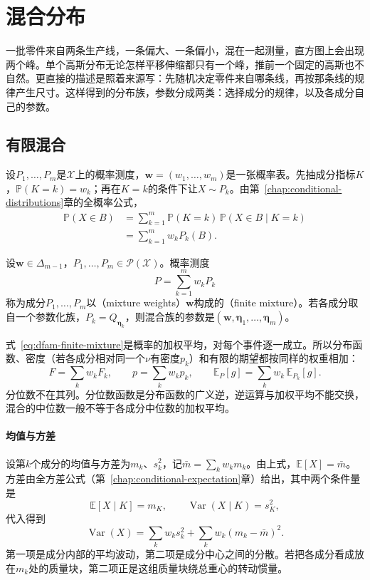 \section{混合分布}
\label{sec:dfam-mixtures}

一批零件来自两条生产线，一条偏大、一条偏小，混在一起测量，直方图上会出现两个峰。单个高斯分布无论怎样平移伸缩都只有一个峰，推前一个固定的高斯也不自然。更直接的描述是照着来源写：先随机决定零件来自哪条线，再按那条线的规律产生尺寸。这样得到的分布族，参数分成两类：选择成分的规律，以及各成分自己的参数。

\subsection{有限混合}
\label{sec:dfam-finite-mixture}

设$P_1,\dots,P_m$是$\mathcal{X}$上的概率测度，$\bm{w}=(w_1,\dots,w_m)$是一张概率表。先抽成分指标$K$，$\mathbb{P}(K=k)=w_k$；再在$K=k$的条件下让$X\sim P_k$。由第~\ref{chap:conditional-distributions}章的全概率公式，
\[
  \begin{aligned}
    \mathbb{P}(X\in B)&=\sum_{k=1}^{m}\mathbb{P}(K=k)\,\mathbb{P}(X\in B\mid K=k)\\
    &=\sum_{k=1}^{m}w_kP_k(B).
  \end{aligned}
\]

\begin{definition}[有限混合]
\label{def:dfam-finite-mixture}
设$\bm{w}\in\Delta_{m-1}$，$P_1,\dots,P_m\in\mathcal{P}(\mathcal{X})$。概率测度
\begin{equation}
  P=\sum_{k=1}^{m}w_kP_k
  \label{eq:dfam-finite-mixture}
\end{equation}
称为成分$P_1,\dots,P_m$以（mixture weights）$\bm{w}$构成的（finite mixture）。若各成分取自一个参数化族，$P_k=Q_{\bm{\eta}_k}$，则混合族的参数是$(\bm{w},\bm{\eta}_1,\dots,\bm{\eta}_m)$。
\end{definition}

式~\eqref{eq:dfam-finite-mixture}是概率的加权平均，对每个事件逐一成立。所以分布函数、密度（若各成分相对同一个$\nu$有密度$p_k$）和有限的期望都按同样的权重相加：
\[
  F=\sum_kw_kF_k,\qquad p=\sum_kw_kp_k,\qquad\mathbb{E}_P[g]=\sum_kw_k\,\mathbb{E}_{P_k}[g].
\]
分位数不在其列。分位数函数是分布函数的广义逆，逆运算与加权平均不能交换，混合的中位数一般不等于各成分中位数的加权平均。

\paragraph{均值与方差}
设第$k$个成分的均值与方差为$m_k$、$s_k^{2}$，记$\bar{m}=\sum_kw_km_k$。由上式，$\mathbb{E}[X]=\bar{m}$。方差由全方差公式（第~\ref{chap:conditional-expectation}章）给出，其中两个条件量是
\[
  \mathbb{E}[X\mid K]=m_K,\qquad\operatorname{Var}(X\mid K)=s_K^{2},
\]
代入得到
\begin{equation}
  \operatorname{Var}(X)=\sum_{k}w_ks_k^{2}+\sum_kw_k(m_k-\bar{m})^{2}.
  \label{eq:dfam-mixture-variance}
\end{equation}
第一项是成分内部的平均波动，第二项是成分中心之间的分散。若把各成分看成放在$m_k$处的质量块，第二项正是这组质量块绕总重心的转动惯量。

